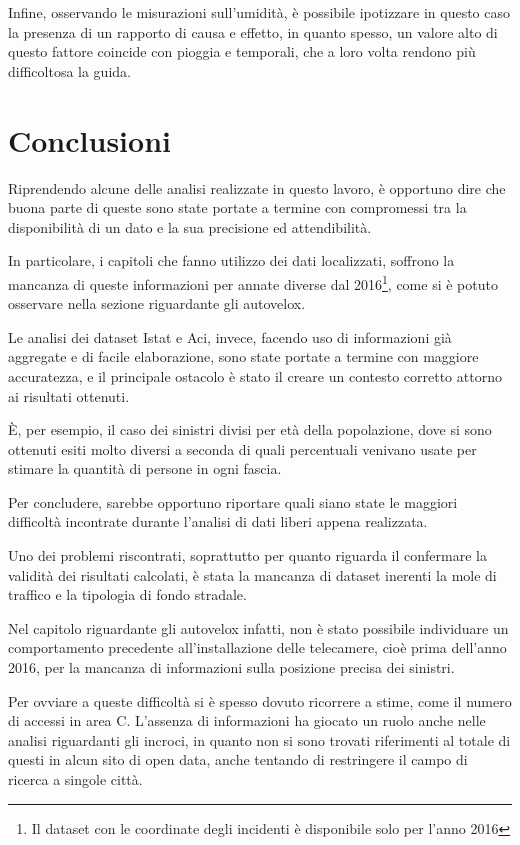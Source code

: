 \documentclass[a4paper]{report}
\newcommand{\skipline}{\vspace{0.2in}}
\begin{document}
Infine, osservando le misurazioni sull'umidità, è possibile ipotizzare 
in questo caso la presenza di un rapporto di causa e effetto, 
in quanto spesso, un valore alto di questo fattore 
coincide con pioggia e temporali, che a loro volta rendono più difficoltosa la guida. 

\chapter{Conclusioni}

Riprendendo alcune delle analisi realizzate in questo lavoro, è opportuno dire che buona 
parte di queste sono state portate a termine con compromessi 
tra la disponibilità di un dato e la sua precisione ed attendibilità.

In particolare, i capitoli che fanno utilizzo dei dati localizzati, soffrono la mancanza di 
queste informazioni per annate diverse dal 
2016\footnote{Il dataset con le coordinate degli incidenti è disponibile solo per l'anno 2016}, 
come si è potuto osservare nella sezione riguardante gli autovelox. 

Le analisi dei dataset Istat e Aci, invece, facendo uso di informazioni già aggregate 
e di facile elaborazione, sono state portate a termine con maggiore 
accuratezza, e il principale ostacolo è stato il creare un contesto 
corretto attorno ai risultati ottenuti. 

\`E, per esempio, il caso dei sinistri divisi per età della popolazione, 
dove si sono ottenuti esiti 
molto diversi a seconda di quali percentuali venivano usate per stimare la quantità di 
persone in ogni fascia. 

\skipline
Per concludere, sarebbe opportuno riportare quali siano state le maggiori difficoltà 
incontrate durante l'analisi di dati liberi appena realizzata. 

Uno dei problemi riscontrati, soprattutto per quanto riguarda il confermare la 
validità dei risultati calcolati, è stata la mancanza di dataset 
inerenti la mole di traffico e la tipologia di fondo stradale.

Nel capitolo riguardante gli autovelox infatti, non è stato possibile individuare 
un comportamento precedente all'installazione delle telecamere, cioè prima dell'anno 2016, 
per la mancanza di informazioni sulla posizione precisa dei sinistri. 

Per ovviare a queste difficoltà si è spesso dovuto ricorrere a stime, 
come il numero di accessi in area C. 
L'assenza di informazioni ha giocato un ruolo anche nelle analisi riguardanti gli incroci, 
in quanto non si sono trovati riferimenti al totale di questi in alcun sito di open data, 
anche tentando di restringere il campo di ricerca a singole città. 
\end{document}
